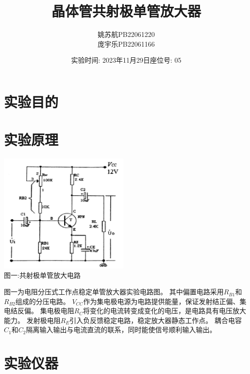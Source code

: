 \documentclass[a4paper]{article}
\title{\textbf{晶体管共射极单管放大器}}
\author{姚苏航\qquad PB22061220 \\ 庞宇乐\qquad PB22061166}
\date{实验时间: 2023年11月29日\qquad 座位号: 05}
\begin{document}
    \maketitle


    \section{实验目的\cite{ed4}}\label{sec:}



    \vspace{1cm}


    \section{实验原理}\label{sec:10}
    \begin{center}
        \includegraphics[height=170pt]{AC}\\
        {\small 图一:共射极单管放大电路}
    \end{center}

    {{图一为电阻分压式工作点稳定单管放大器实验电路图。
    其中偏置电路采用$R_{B1}$和$R_{B2}$组成的分压电路。
    $V_{CC}$作为集电极电源为电路提供能量，保证发射结正偏、集电结反偏。
    集电极电阻$R_C$将变化的电流转变成变化的电压，是电路具有电压放大能力。
    发射极电阻$R_E$引入负反馈稳定电路，稳定放大器静态工作点。
    耦合电容$C_1$和$C_2$隔离输入输出与电流直流的联系，同时能使信号顺利输入输出。}}
    \vspace{1cm}


    \section{实验仪器}\label{sec:2}
    \vspace{1cm}
\end{document}
